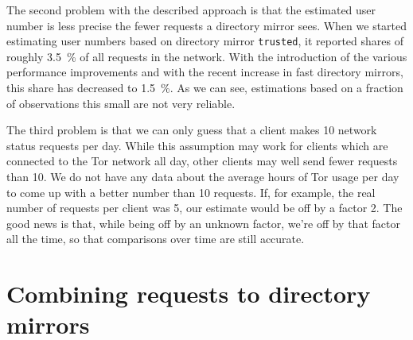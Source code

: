 \documentclass{article}
\begin{document}

The second problem with the described approach is that the estimated user
number is less precise the fewer requests a directory mirror sees.
When we started estimating user numbers based on directory mirror
\texttt{trusted}, it reported shares of roughly 3.5~\% of all requests in
the network.
With the introduction of the various performance improvements and with the
recent increase in fast directory mirrors, this share has decreased to
1.5~\%.
As we can see, estimations based on a fraction of observations this small
are not very reliable.

The third problem is that we can only guess that a client makes 10 network
status requests per day.
While this assumption may work for clients which are connected to the Tor
network all day, other clients may well send fewer requests than 10.
We do not have any data about the average hours of Tor usage per day to
come up with a better number than 10 requests.
If, for example, the real number of requests per client was 5, our
estimate would be off by a factor 2.
The good news is that, while being off by an unknown factor, we're off by
that factor all the time, so that comparisons over time are still
accurate.


\section{Combining requests to directory mirrors}
\label{sec:combine}
\end{document}
